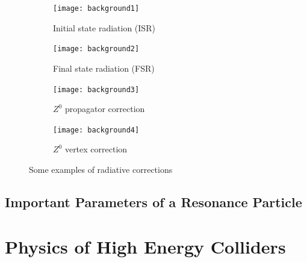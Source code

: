 \begin{figure}[H]
\centering
\begin{subfigure}{0.45\textwidth}
    \texttt{[image: background1]}
    \caption{Initial state radiation (ISR)}
\end{subfigure}
\begin{subfigure}{0.45\textwidth}
    \texttt{[image: background2]}
    \caption{Final state radiation (FSR)}
\end{subfigure}
\begin{subfigure}{0.45\textwidth}
    \texttt{[image: background3]}
    \caption{$Z^{0}$ propagator correction}
\end{subfigure}
\begin{subfigure}{0.45\textwidth}
    \texttt{[image: background4]}
    \caption{$Z^{0}$ vertex correction}
\end{subfigure}       
\caption{Some examples of radiative corrections}
\label{fig:backfig}
\end{figure}

\subsection{Important Parameters of a Resonance Particle}

\section{Physics of High Energy Colliders}